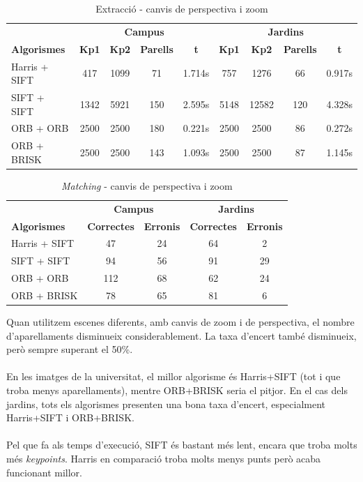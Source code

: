 		\begin{table}[H]
			\begin{center}
				\begin{tabular}{l | c c c c | c c c c}
					& \multicolumn{4}{c|}{\textbf{Campus}} & \multicolumn{4}{c}{\textbf{Jardins}} \\
					\textbf{Algorismes} & \textbf{Kp1} & \textbf{Kp2} & \textbf{Parells} & \textbf{t} & \textbf{Kp1} & \textbf{Kp2} & \textbf{Parells} & \textbf{t} \\ \hline
					Harris + SIFT & 417 & 1099 & 71 & 1.714s & 757 & 1276 & 66 & 0.917s \\
					SIFT + SIFT & 1342 & 5921 & 150 & 2.595s & 5148 & 12582 & 120 & 4.328s \\
					ORB + ORB & 2500 & 2500 & 180 & 0.221s & 2500 & 2500 & 86 & 0.272s \\
					ORB + BRISK & 2500 & 2500 & 143 & 1.093s & 2500 & 2500 & 87 & 1.145s \\
				\end{tabular}
			\end{center}
			\caption{Extracció - canvis de perspectiva i zoom}
		\end{table}

		\begin{table}[H]
			\begin{center}
				\begin{tabular}{l | c c | c c}
					& \multicolumn{2}{c|}{\textbf{Campus}} & \multicolumn{2}{c}{\textbf{Jardins}} \\
					\textbf{Algorismes} & \textbf{Correctes} & \textbf{Erronis} & \textbf{Correctes} & \textbf{Erronis} \\ \hline
					Harris + SIFT & 47 & 24 & 64 & 2 \\
					SIFT + SIFT & 94 & 56 & 91 & 29 \\
					ORB + ORB & 112 & 68 & 62 & 24 \\
					ORB + BRISK & 78 & 65 & 81 & 6 \\
				\end{tabular}
			\end{center}
			\caption{\textit{Matching} - canvis de perspectiva i zoom}
		\end{table}
		\noindent
		Quan utilitzem escenes diferents, amb canvis de zoom i de perspectiva, el nombre d'aparellaments disminueix considerablement. La taxa d'encert també disminueix, però sempre superant el 50\%.\\\\
		En les imatges de la universitat, el millor algorisme és Harris+SIFT (tot i que troba menys aparellaments), mentre ORB+BRISK seria el pitjor. En el cas dels jardins, tots els algorismes presenten
		una bona taxa d'encert, especialment Harris+SIFT i ORB+BRISK.\\\\
		Pel que fa als temps d'execució, SIFT és bastant més lent, encara que troba molts més \textit{keypoints}. Harris en comparació troba molts menys punts però acaba funcionant millor.\\
		
